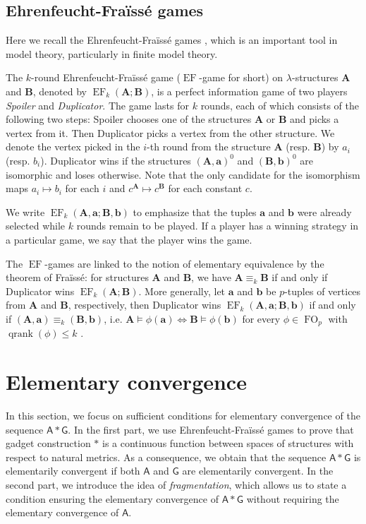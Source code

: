 \documentclass[11pt]{article}
\theoremstyle{plain}
\theoremstyle{definition}
\theoremstyle{remark}
\DeclareMathOperator\qranksym{qrank}
\newcommand{\qrank}[1]{{\qranksym({#1})}}
\DeclareMathOperator\FO{FO}
\DeclareMathOperator{\EF}{EF}
\newcommand{\str}[1]{\mathbf{#1}}
\newcommand{\strseq}[1]{{\boldsymbol{\mathsf{#1}}}}
\newcommand{\tpl}[1]{{\bm{#1}}}
\begin{document}
\subsection{Ehrenfeucht-Fra\"{i}ss\'{e} games}\label{ssec:ef_games}

Here we recall the Ehrenfeucht-Fra\"{i}ss\'{e} games \cite{fraisse}\cite{ehrenfeucht}, which is an important tool in model theory, particularly in finite model theory.

The $k$-round Ehrenfeucht-Fra\"{i}ss\'{e} game ($\EF$-game for short) on $\lambda$-structures $\str{A}$ and $\str{B}$, denoted by $\EF_k(\str{A}; \str{B})$, is a perfect information game of two players \emph{Spoiler} and \emph{Duplicator}.
The game lasts for $k$ rounds, each of which consists of the following two steps: Spoiler chooses one of the structures $\str{A}$ or $\str{B}$ and picks a vertex from it.
Then Duplicator picks a vertex from the other structure.
We denote the vertex picked in the $i$-th round from the structure $\str{A}$ (resp. $\str{B}$) by $a_i$ (resp. $b_i$).
Duplicator wins if the structures $(\str{A}, \tpl{a})^0$ and $(\str{B}, \tpl{b})^0$ are isomorphic and loses otherwise.
Note that the only candidate for the isomorphism maps $a_i \mapsto b_i$ for each $i$ and $c^\str{A} \mapsto c^\str{B}$ for each constant $c$.

We write $\EF_k(\str{A}, \tpl{a}; \str{B}, \tpl{b})$ to emphasize that the tuples $\tpl{a}$ and $\tpl{b}$ were already selected while $k$ rounds remain to be played.
If a player has a winning strategy in a particular game, we say that the player wins the game.

The $\EF$-games are linked to the notion of elementary equivalence by the theorem of Fra\"{i}ss\'{e}: for structures $\str{A}$ and $\str{B}$, we have $\str{A} \equiv_k \str{B}$ if and only if Duplicator wins $\EF_k(\str{A};\str{B})$.
More generally, let $\tpl{a}$ and $\tpl{b}$ be $p$-tuples of vertices from $\str{A}$ and $\str{B}$, respectively, then Duplicator wins $\EF_k(\str{A},\tpl{a}; \str{B}, \tpl{b})$ if and only if $(\str{A},\tpl{a}) \equiv_k (\str{B},\tpl{b})$, i.e. $\str{A} \models \phi(\tpl{a}) \Leftrightarrow \str{B} \models \phi(\tpl{b})$ for every $\phi \in \FO_p$ with $\qrank{\phi} \leq k$ \cite{fraisse}. \section{Elementary convergence}\label{sec:elementary_convergence}

In this section, we focus on sufficient conditions for elementary convergence of the sequence $\strseq{A} * \strseq{G}$.
In the first part, we use Ehrenfeucht-Fra\"{i}ss\'{e} games to prove that gadget construction $*$ is a continuous function between spaces of structures with respect to natural metrics.
As a consequence, we obtain that the sequence $\strseq{A} * \strseq{G}$ is elementarily convergent if both $\strseq{A}$ and $\strseq{G}$ are elementarily convergent.
In the second part, we introduce the idea of \emph{fragmentation}, which allows us to state a condition ensuring the elementary convergence of $\strseq{A} * \strseq{G}$ without requiring the elementary convergence of $\strseq{A}$.
\end{document}
